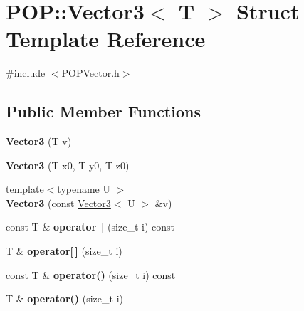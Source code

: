 \hypertarget{struct_p_o_p_1_1_vector3}{}\section{P\+OP\+:\+:Vector3$<$ T $>$ Struct Template Reference}
\label{struct_p_o_p_1_1_vector3}


{\ttfamily \#include $<$P\+O\+P\+Vector.\+h$>$}

\subsection*{Public Member Functions}
\begin{DoxyCompactItemize}
\item 
\mbox{\label{struct_p_o_p_1_1_vector3_aeb800855cd68d7e1e21d0a6b69d24af2}} 
{\bfseries Vector3} (T v)
\item 
\mbox{\label{struct_p_o_p_1_1_vector3_a7f9b798b03a28002bb70b8bbfd45b9f8}} 
{\bfseries Vector3} (T x0, T y0, T z0)
\item 
\mbox{\label{struct_p_o_p_1_1_vector3_a3645102b5769d81957530f6254eb9cb1}} 
{\footnotesize template$<$typename U $>$ }\\{\bfseries Vector3} (const \mbox{\hyperlink{struct_p_o_p_1_1_vector3}{Vector3}}$<$ U $>$ \&v)
\item 
\mbox{\label{struct_p_o_p_1_1_vector3_afb15e0dc755ac3648fa2119de018599d}} 
const T \& {\bfseries operator\mbox{[}$\,$\mbox{]}} (size\+\_\+t i) const
\item 
\mbox{\label{struct_p_o_p_1_1_vector3_a1af8ff231f85743086c9d28def250a79}} 
T \& {\bfseries operator\mbox{[}$\,$\mbox{]}} (size\+\_\+t i)
\item 
\mbox{\label{struct_p_o_p_1_1_vector3_ab91216f7390b58f2cb3008cd1a3ceda1}} 
const T \& {\bfseries operator()} (size\+\_\+t i) const
\item 
\mbox{\label{struct_p_o_p_1_1_vector3_a88d21ca8fafb2c9226e084bbd047589a}} 
T \& {\bfseries operator()} (size\+\_\+t i)
\item 

\end{DoxyCompactItemize}
